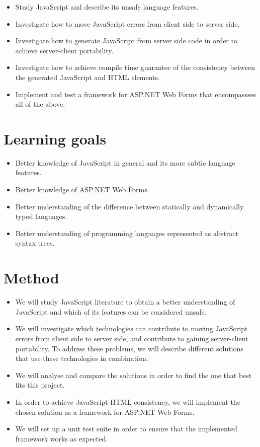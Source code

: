 	\begin{itemize}
		\item Study JavaScript and describe its unsafe language features.
		\item Investigate how to move JavaScript errors from client side to server side. 
		\item Investigate how to generate JavaScript from server side code in order to achieve server-client portability.
		\item Investigate how to achieve compile time guarantee of the consistency between the generated JavaScript and HTML elements.
		\item Implement and test a framework for ASP.NET Web Forms that encompassses all of the above.
	\end{itemize}

	\section{Learning goals}
		\begin{itemize}
			\item Better knowledge of JavaScript in general and its more subtle language features.
			\item Better knowledge of ASP.NET Web Forms.
		 	\item Better understanding of the difference between statically and dynamically typed languages.
			\item Better understanding of programming languages represented as abstract syntax trees.
		\end{itemize}

\section{Method}
	\begin{itemize}
	\item We will study JavaScript literature to obtain a better understanding of JavaScript and which of its features can be considered unsafe. 
	\item We will investigate which technologies can contribute to moving JavaScript errors from client side to server side, and contribute to gaining server-client portability. To address these problems, we will describe different solutions that use these technologies in combination.
	\item We will analyse and compare the solutions in order to find the one that best fits this project. 
	\item In order to achieve JavaScript-HTML consistency, we will implement the chosen solution as a framework for ASP.NET Web Forms.
	\item We will set up a unit test suite in order to ensure that the implemented framework works as expected.
	\end{itemize}


